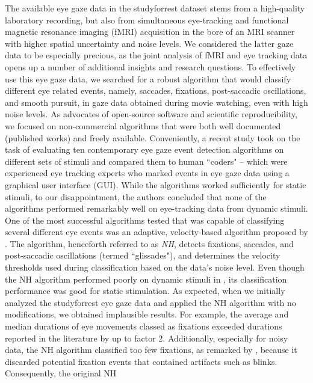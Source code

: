 The available eye gaze data in the studyforrest dataset stems from a
high-quality laboratory recording, but also from simultaneous eye-tracking and
functional magnetic resonance imaging (fMRI) acquisition in the bore of an MRI
scanner with higher spatial uncertainty and noise levels. We considered the
latter gaze data to be especially precious, as the joint analysis of fMRI and
eye tracking data opens up a number of additional insights and research
questions. To effectively use this eye gaze data, we searched for a robust
algorithm that would classify different eye related events, namely, saccades,
fixations, post-saccadic oscillations, and smooth pursuit, in gaze data
obtained during movie watching, even with high noise levels. As advocates of
open-source software and scientific reproducibility, we focused on
non-commercial algorithms that were both well documented (published works) and
freely available. Conveniently, a recent study \citep{Andersson2017} took on
the task of evaluating ten contemporary eye gaze event detection algorithms on
different sets of stimuli and compared them to human ``coders" -- which were
experienced eye tracking experts who marked events in eye gaze data using a
graphical user interface (GUI). While the algorithms worked sufficiently for
static stimuli, to our disappointment, the authors concluded that none of the
algorithms performed remarkably well on eye-tracking data from dynamic stimuli.
One of the most successful algorithms tested that was capable of classifying
several different eye events was an adaptive, velocity-based algorithm proposed
by \citet{Nystrom2010AnData}.  The algorithm, henceforth referred to as
\textit{NH}, detects fixations, saccades, and post-saccadic oscillations
(termed ``glissades"), and determines the velocity thresholds used during
classification based on the data's noise level. Even though the NH algorithm
performed poorly on dynamic stimuli in \citet{Andersson2017}, its
classification performance was good for static stimulation. As expected, when
we initially analyzed the studyforrest eye gaze data and applied the NH
algorithm with no modifications, we obtained implausible results.  For example,
the average and median durations of eye movements  classed as fixations
exceeded durations  reported in the literature
\citep{holmqvist2011eye,dorr2010variability} by up to factor 2. Additionally,
especially for noisy data, the NH algorithm classified too few fixations, as
remarked by \citet{Friedman2018}, because it discarded potential fixation
events that contained artifacts such as blinks. Consequently, the original NH
